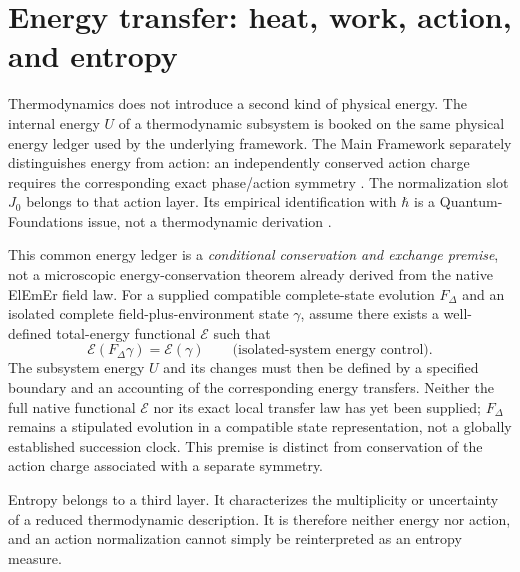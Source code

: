 \documentclass[11pt]{article}
\theoremstyle{definition}
\newcommand{\ElEmEr}{\mbox{ElEmEr}}
\begin{document}
\section{Energy transfer: heat, work, action, and entropy}
\label{sec:bookkeeping}
Thermodynamics does not introduce a second kind of physical energy.  The internal energy
$U$ of a thermodynamic subsystem is booked on the same physical energy ledger used by the
underlying framework.  The Main Framework separately distinguishes energy from action:
an independently conserved action charge requires the corresponding exact phase/action
symmetry \cite{CmotionMainFramework2026}.  The normalization slot $J_0$ belongs to that
action layer.  Its empirical identification with $\hbar$ is a Quantum-Foundations issue,
not a thermodynamic derivation \cite{CmotionQuantumFoundations2026}.

This common energy ledger is a \emph{conditional conservation and exchange premise},
not a microscopic energy-conservation theorem already derived from the native \ElEmEr{}
field law.  For a supplied compatible complete-state evolution $F_\Delta$ and an
isolated complete field-plus-environment state $\gamma$, assume there exists a
well-defined total-energy functional $\mathcal E$ such that
\begin{equation}
  \mathcal E(F_\Delta\gamma)=\mathcal E(\gamma)
  \qquad\text{(isolated-system energy control).}
  \label{eq:energy-conservation-control}
\end{equation}
The subsystem energy $U$ and its changes must then be defined by a specified boundary
and an accounting of the corresponding energy transfers.  Neither the full native
functional $\mathcal E$ nor its exact local transfer law has yet been supplied;
$F_\Delta$ remains a stipulated evolution in a compatible state representation, not a
globally established succession clock.  This premise is distinct from conservation
of the action charge associated with a separate symmetry.

Entropy belongs to a third layer.  It characterizes the multiplicity or uncertainty of a
reduced thermodynamic description.  It is therefore neither energy nor action, and an
action normalization cannot simply be reinterpreted as an entropy measure.
\end{document}
